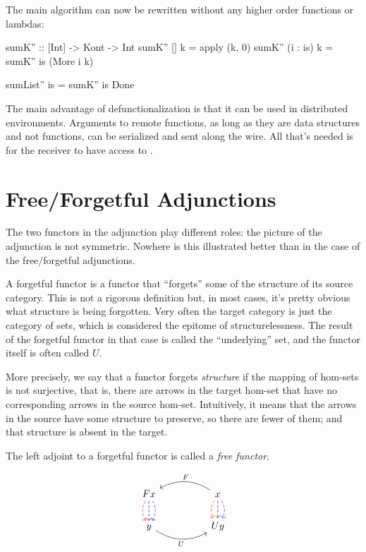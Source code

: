 \documentclass[DaoFP]{subfiles}
\begin{document}
The main algorithm can now be rewritten without any higher order functions or lambdas:
\begin{haskell}
sumK'' :: [Int] -> Kont -> Int
sumK'' [] k = apply (k, 0)
sumK'' (i : is) k = sumK'' is (More i k)
\end{haskell}

\begin{haskell}
sumList'' is = sumK'' is Done
\end{haskell}

The main advantage of defunctionalization is that it can be used in distributed environments. Arguments to remote functions, as long as they are data structures and not functions, can be serialized and sent along the wire. All that's needed is for the receiver to have access to . 

\section{Free/Forgetful Adjunctions}
The two functors in the adjunction play different roles: the picture of the adjunction is not symmetric. Nowhere is this illustrated better than in the case of the free/forgetful adjunctions. 

A forgetful functor is a functor that ``forgets'' some of the structure of its source category. This is not a rigorous definition but, in most cases, it's pretty obvious what structure is being forgotten. Very often the target category is just the category of sets, which is considered the epitome of structurelessness. The result of the forgetful functor in that case is called the ``underlying'' set, and the functor itself is often called $U$. 

More precisely, we say that a functor forgets \emph{structure} if the mapping of hom-sets is not surjective, that is, there are arrows in the target hom-set that have no corresponding arrows in the source hom-set. Intuitively, it means that the arrows in the source have some structure to preserve, so there are fewer of them; and that structure is absent in the target. 

The left adjoint to a forgetful functor is called a \emph{free functor}.

\[
 \begin{tikzcd}
F x
\arrow[d, bend right, red, dashed]
\arrow[d, dashed]
\arrow[d, bend left, blue, dashed]
  &&
  x
\arrow[d, bend right, red, dashed]
\arrow[d, dashed]
\arrow[d, bend left, blue, dashed]
 \arrow[ll, bend right, "F"']
 \\
y
   \arrow[rr, bend right, "U"']
 &&
 U y
  \end{tikzcd}
\]
\end{document}
